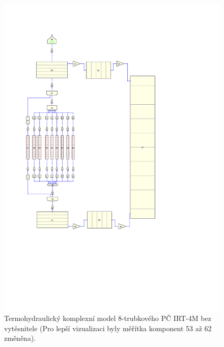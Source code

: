 \begin{figure}[H]
	\centering
	\includegraphics[width=\textwidth, trim={4cm 15cm 12cm 6cm}, clip]{./07_prilohy/prehled_modelu/t8bk.pdf}
	\caption{Termohydraulický komplexní model 8-trubkového PČ IRT-4M bez vytěsnitele (Pro lepší vizualizaci byly měřítka komponent 53 až 62 změněna).}
	\label{fig:irt_nat_conv_komplex}
\end{figure} 

